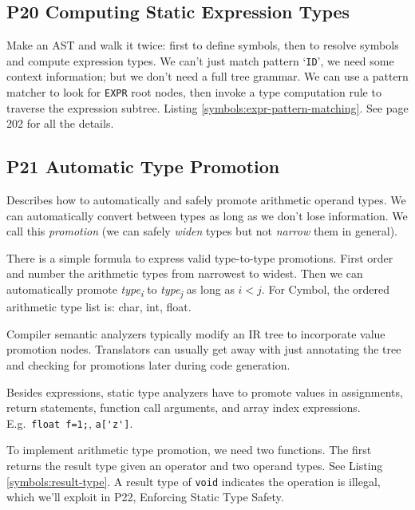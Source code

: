 \subsection{P20 Computing Static Expression Types}

Make an AST and walk it twice:
first to define symbols, then to resolve symbols and compute expression types.
We can't just match pattern `\verb=ID=', we need some context information;
but we don't need a full tree grammar.
We can use a pattern matcher to look for \verb=EXPR= root nodes,
then invoke a type computation rule to traverse the expression subtree.
Listing \ref{symbols:expr-pattern-matching}.
See page 202 for all the details.

\begin{program}
\caption{\label{symbols:expr-pattern-matching}}
\end{program}


\subsection{P21 Automatic Type Promotion}

Describes how to automatically and safely promote arithmetic operand types.
We can automatically convert between types
as long as we don't lose information.
We call this \emph{promotion}
(we can safely \emph{widen} types but not \emph{narrow} them in general).

There is a simple formula to express valid type-to-type promotions.
First order and number the arithmetic types from narrowest to widest.
Then we can automatically promote
\emph{type\textsubscript{i}} to \emph{type\textsubscript{j}}
as long as $i < j$.
For Cymbol, the ordered arithmetic type list is: char, int, float.

Compiler semantic analyzers typically modify an IR tree
to incorporate value promotion nodes.
Translators can usually get away with just annotating the tree
and checking for promotions later during code generation.

Besides expressions, static type analyzers have to promote values
in assignments, return statements, function call arguments,
and array index expressions.\\
E.g.\ \verb-float f=1;-, \verb=a['z']=.

To implement arithmetic type promotion, we need two functions.
The first returns the result type given an operator and two operand types.
See Listing \ref{symbols:result-type}.
A result type of \verb=void= indicates the operation is illegal,
which we'll exploit in P22, Enforcing Static Type Safety.

